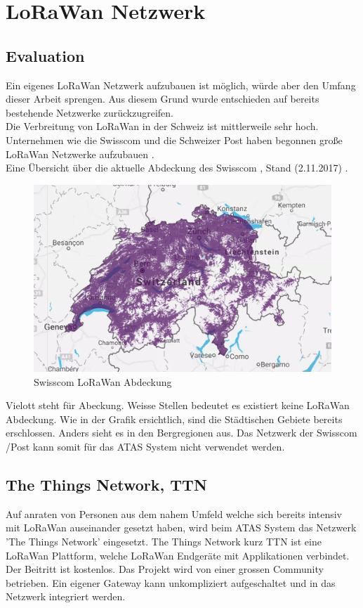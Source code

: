 \documentclass[11pt,english,german]{report}
\theoremstyle{definition}
\begin{document}
\newpage
\section{LoRaWan Netzwerk}
\subsection{Evaluation}
Ein eigenes LoRaWan Netzwerk aufzubauen ist möglich, würde aber den Umfang dieser Arbeit sprengen. Aus diesem Grund wurde entschieden auf bereits bestehende Netzwerke zurückzugreifen.\\[0.3cm]
Die Verbreitung von LoRaWan in der Schweiz ist mittlerweile sehr hoch. Unternehmen wie die Swisscom und die Schweizer Post haben begonnen große LoRaWan Netzwerke aufzubauen \cite{swisscompost}.\\[0.3cm]
Eine Übersicht über die aktuelle Abdeckung des Swisscom , Stand (2.11.2017)  \cite{swisscomcoverage}.
\begin{figure}[H]
	\centering
	\includegraphics[width=\textwidth]{img/lora/swisscomlorawan.jpg}
	\caption[Swisscom LoRaWan Abdeckung]
	{Swisscom LoRaWan Abdeckung}
\end{figure}
\noindent
Vielott steht für Abeckung. Weisse Stellen bedeutet es existiert keine LoRaWan Abdeckung. Wie in der Grafik ersichtlich, sind die Städtischen Gebiete bereits erschlossen. Anders sieht es in den Bergregionen aus. Das Netzwerk der Swisscom /Post kann somit für das ATAS System nicht verwendet werden.\

\newpage
\subsection{The Things Network, TTN}
Auf anraten von Personen aus dem nahem Umfeld welche sich bereits intensiv mit LoRaWan auseinander gesetzt haben, wird beim ATAS System das Netzwerk 'The Things Network' eingesetzt. The Things Network kurz TTN ist eine LoRaWan Plattform, welche LoRaWan Endgeräte mit Applikationen verbindet. Der Beitritt ist kostenlos. Das Projekt wird von einer grossen Community betrieben. Ein eigener Gateway kann unkompliziert aufgeschaltet und in das Netzwerk integriert werden. 
\end{document}
